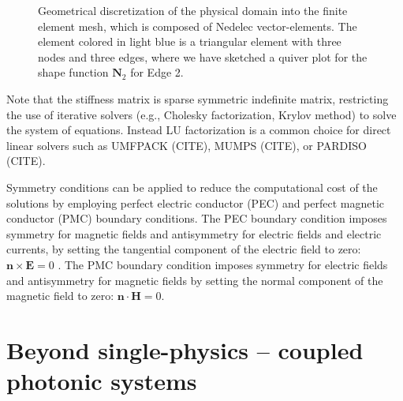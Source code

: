     \begin{figure}[tb]
        \centering

        \caption{Geometrical discretization of the physical domain into the finite
            element mesh, which is composed of Nedelec vector-elements. The element colored
            in light blue is a triangular element with three nodes and three edges, where
            we have sketched a quiver plot for the shape function $\mathbf{N}_2$ for Edge
            2.}
        \label{fig:fem}
    \end{figure}

    Note that the stiffness matrix is sparse symmetric indefinite matrix,
    restricting the use of iterative solvers
    (e.g., Cholesky factorization, Krylov method) to solve the system of equations.
    Instead LU factorization is
    a common choice for direct linear solvers such as UMFPACK (CITE), MUMPS (CITE),
    or PARDISO (CITE).

    Symmetry conditions can be applied to reduce the computational
    cost of the solutions by employing perfect electric conductor (PEC) and perfect
    magnetic
    conductor (PMC) boundary conditions. The PEC boundary condition
    imposes symmetry for magnetic fields and antisymmetry for electric fields and
    electric
    currents, by setting the tangential component of the electric field to zero:
$\mathbf{n}\times \mathbf{E} = 0$ .
    The PMC boundary condition imposes symmetry for electric fields and
    antisymmetry for magnetic fields
    by setting the normal component of the magnetic field to zero: $\mathbf{n}\cdot
\mathbf{H} = 0$.

    \section{Beyond single-physics -- coupled photonic systems}\label{sec:coupled}

